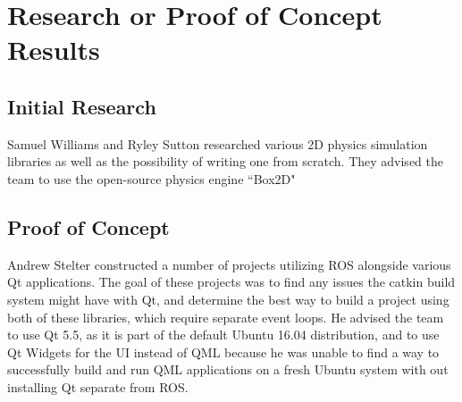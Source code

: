 \section{Research or Proof of Concept Results}
\subsection{Initial Research}
Samuel Williams and Ryley Sutton researched various 2D physics simulation libraries as well as the possibility of writing one from scratch. They advised the team to use the open-source physics engine ``Box2D"

\subsection{Proof of Concept}
Andrew Stelter constructed a number of projects utilizing ROS alongside various Qt applications. The goal of these projects was to find any issues the catkin build system might have with Qt, and determine the best way to build a project using both of these libraries, which require separate event loops. He advised the team to use Qt 5.5, as it is part of the default Ubuntu 16.04 distribution, and to use Qt Widgets for the UI instead of QML because he was unable to find a way to successfully build and run QML applications on a fresh Ubuntu system with out installing Qt separate from ROS.
